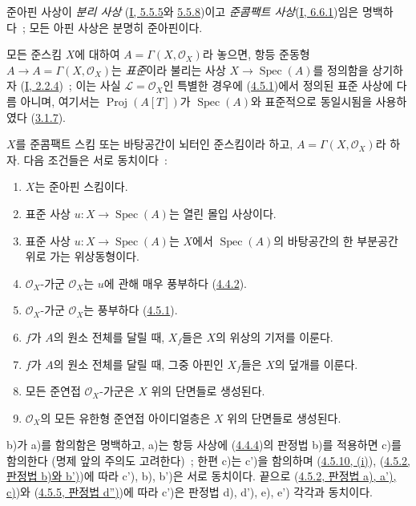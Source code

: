 준아핀 사상이 \emph{분리 사상}
(\hyperref[I.5.5.5-ko]{I, 5.5.5}와 \hyperref[I.5.5.8-ko]{5.5.8})이고
\emph{준콤팩트 사상}(\hyperref[I.6.6.1-ko]{I, 6.6.1})임은 명백하다~;
모든 아핀 사상은 분명히 준아핀이다.

모든 준스킴 $X$에 대하여 $A=\Gamma(X,\mathcal{O}_X)$라 놓으면, 항등
준동형 $A\to A=\Gamma(X,\mathcal{O}_X)$는 \emph{표준}이라 불리는 사상
$X\to\operatorname{Spec}(A)$를 정의함을 상기하자
(\hyperref[I.2.2.4-ko]{I, 2.2.4})~; 이는 사실 $\mathcal{L}=\mathcal{O}_X$인
특별한 경우에 (\hyperref[II.4.5.1-ko]{4.5.1})에서 정의된 표준 사상에
다름 아니며, 여기서는 $\operatorname{Proj}(A[T])$가
$\operatorname{Spec}(A)$와 표준적으로 동일시됨을 사용하였다
(\hyperref[II.3.1.7-ko]{3.1.7}).

\begin{proposition}[5.1.2]
\label{II.5.1.2-ko}
$X$를 준콤팩트 스킴 또는 바탕공간이 뇌터인 준스킴이라 하고,
$A=\Gamma(X,\mathcal{O}_X)$라 하자. 다음 조건들은 서로 동치이다~:
\begin{enumerate}
  \item[\rm{a)}] $X$는 준아핀 스킴이다.
  \item[\rm{b)}] 표준 사상 $u:X\to\operatorname{Spec}(A)$는 열린 몰입
  사상이다.
  \item[\rm{b')}] 표준 사상 $u:X\to\operatorname{Spec}(A)$는 $X$에서
  $\operatorname{Spec}(A)$의 바탕공간의 한 부분공간 위로 가는
  위상동형이다.
  \item[\rm{c)}] $\mathcal{O}_X$-가군 $\mathcal{O}_X$는 $u$에 관해 매우
  풍부하다 (\hyperref[II.4.4.2-ko]{4.4.2}).
  \item[\rm{c')}] $\mathcal{O}_X$-가군 $\mathcal{O}_X$는 풍부하다
  (\hyperref[II.4.5.1-ko]{4.5.1}).
  \item[\rm{d)}] $f$가 $A$의 원소 전체를 달릴 때, $X_f$들은 $X$의
  위상의 기저를 이룬다.
  \item[\rm{d')}] $f$가 $A$의 원소 전체를 달릴 때, 그중 아핀인
  $X_f$들은 $X$의 덮개를 이룬다.


  \item[\rm{e)}] 모든 준연접 $\mathcal{O}_X$-가군은 $X$ 위의 단면들로
  생성된다.
  \item[\rm{e')}] $\mathcal{O}_X$의 모든 유한형 준연접 아이디얼층은
  $X$ 위의 단면들로 생성된다.
\end{enumerate}
\end{proposition}

b)가 a)를 함의함은 명백하고, a)는 항등 사상에
(\hyperref[II.4.4.4-ko]{4.4.4})의 판정법 b)를 적용하면 c)를 함의한다
(명제 앞의 주의도 고려한다)~; 한편 c)는 c')을 함의하며
(\hyperref[II.4.5.10-ko]{4.5.10, (i)}),
(\hyperref[II.4.5.2-ko]{4.5.2, 판정법 b)와 b')})에 따라 c'), b), b')은
서로 동치이다. 끝으로 (\hyperref[II.4.5.2-ko]{4.5.2, 판정법 a), a'), c)})와
(\hyperref[II.4.5.5-ko]{4.5.5, 판정법 d'')})에 따라 c')은 판정법 d), d'),
e), e') 각각과 동치이다.

